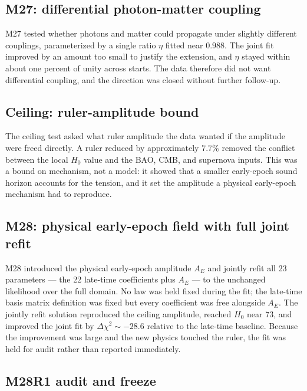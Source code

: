 \subsection{M27: differential photon-matter coupling}
\label{app:history-m27}

M27 tested whether photons and matter could propagate under slightly
different couplings, parameterized by a single ratio $\eta$ fitted near
$0.988$. The joint fit improved by an amount too small to justify the
extension, and $\eta$ stayed within about one percent of unity across
starts. The data therefore did not want differential coupling, and the
direction was closed without further follow-up.

\subsection{Ceiling: ruler-amplitude bound}
\label{app:history-ceiling}

The ceiling test asked what ruler amplitude the data wanted if the
amplitude were freed directly. A ruler reduced by approximately $7.7$\%
removed the conflict between the local $H_{0}$ value and the BAO, CMB,
and supernova inputs. This was a bound on mechanism, not a model: it
showed that a smaller early-epoch sound horizon accounts for the
tension, and it set the amplitude a physical early-epoch mechanism had to reproduce.

\subsection{M28: physical early-epoch field with full joint refit}
\label{app:history-m28}

M28 introduced the physical early-epoch amplitude $A_{E}$ and jointly
refit all 23 parameters --- the 22 late-time coefficients plus $A_{E}$
--- to the unchanged likelihood over the full domain. No law was held
fixed during the fit; the late-time basis matrix definition was fixed
but every coefficient was free alongside $A_{E}$. The jointly refit
solution reproduced the ceiling amplitude, reached $H_{0}$ near $73$,
and improved the joint fit by $\Delta\chi^{2}\sim-28.6$ relative to the
late-time baseline. Because the improvement was large and the new
physics touched the ruler, the fit was held for audit rather than
reported immediately.

\subsection{M28R1 audit and freeze}
\label{app:history-m28r1}

